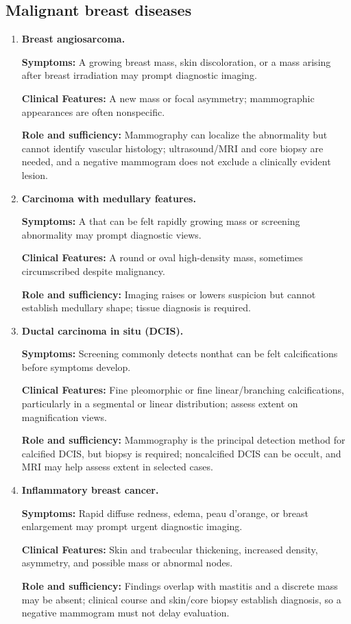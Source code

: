 \subsection{Malignant breast diseases}
\begin{enumerate}[leftmargin=*,itemsep=0.45em,topsep=0.4em]
\item \textbf{Breast angiosarcoma.}\par\noindent\textbf{Symptoms:} A growing breast mass, skin discoloration, or a mass arising after breast irradiation may prompt diagnostic imaging.\par\noindent\textbf{Clinical Features:} A new mass or focal asymmetry; mammographic appearances are often nonspecific.\par\noindent\textbf{Role and sufficiency:} Mammography can localize the abnormality but cannot identify vascular histology; ultrasound/MRI and core biopsy are needed, and a negative mammogram does not exclude a clinically evident lesion.
\item \textbf{Carcinoma with medullary features.}\par\noindent\textbf{Symptoms:} A that can be felt rapidly growing mass or screening abnormality may prompt diagnostic views.\par\noindent\textbf{Clinical Features:} A round or oval high-density mass, sometimes circumscribed despite malignancy.\par\noindent\textbf{Role and sufficiency:} Imaging raises or lowers suspicion but cannot establish medullary shape; tissue diagnosis is required.
\item \textbf{Ductal carcinoma in situ (DCIS).}\par\noindent\textbf{Symptoms:} Screening commonly detects nonthat can be felt calcifications before symptoms develop.\par\noindent\textbf{Clinical Features:} Fine pleomorphic or fine linear/branching calcifications, particularly in a segmental or linear distribution; assess extent on magnification views.\par\noindent\textbf{Role and sufficiency:} Mammography is the principal detection method for calcified DCIS, but biopsy is required; noncalcified DCIS can be occult, and MRI may help assess extent in selected cases.
\item \textbf{Inflammatory breast cancer.}\par\noindent\textbf{Symptoms:} Rapid diffuse redness, edema, peau d'orange, or breast enlargement may prompt urgent diagnostic imaging.\par\noindent\textbf{Clinical Features:} Skin and trabecular thickening, increased density, asymmetry, and possible mass or abnormal nodes.\par\noindent\textbf{Role and sufficiency:} Findings overlap with mastitis and a discrete mass may be absent; clinical course and skin/core biopsy establish diagnosis, so a negative mammogram must not delay evaluation.

\end{enumerate}
